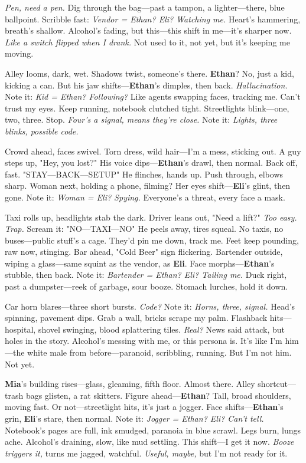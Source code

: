\documentclass{article}
\begin{document}
\textit{Pen, need a pen.} Dig through the bag—past a tampon, a lighter—there, blue ballpoint. Scribble fast: \textit{Vendor = Ethan? Eli? Watching me.} Heart’s hammering, breath’s shallow. Alcohol’s fading, but this—this shift in me—it’s sharper now. \textit{Like a switch flipped when I drank.} Not used to it, not yet, but it’s keeping me moving.

Alley looms, dark, wet. Shadows twist, someone’s there. \textbf{Ethan}? No, just a kid, kicking a can. But his jaw shifts—\textbf{Ethan}’s dimples, then back. \textit{Hallucination.} Note it: \textit{Kid = Ethan? Following?} Like agents swapping faces, tracking me. Can’t trust my eyes. Keep running, notebook clutched tight. Streetlights blink—one, two, three. Stop. \textit{Four’s a signal, means they’re close.} Note it: \textit{Lights, three blinks, possible code.}

Crowd ahead, faces swivel. Torn dress, wild hair—I’m a mess, sticking out. A guy steps up, "Hey, you lost?" His voice dips—\textbf{Ethan}’s drawl, then normal. Back off, fast. "STAY—BACK—SETUP" He flinches, hands up. Push through, elbows sharp. Woman next, holding a phone, filming? Her eyes shift—\textbf{Eli}’s glint, then gone. Note it: \textit{Woman = Eli? Spying.} Everyone’s a threat, every face a mask.

Taxi rolls up, headlights stab the dark. Driver leans out, "Need a lift?" \textit{Too easy. Trap.} Scream it: "NO—TAXI—NO" He peels away, tires squeal. No taxis, no buses—public stuff’s a cage. They’d pin me down, track me. Feet keep pounding, raw now, stinging. Bar ahead, "Cold Beer" sign flickering. Bartender outside, wiping a glass—same squint as the vendor, as \textbf{Eli}. Face morphs—\textbf{Ethan}’s stubble, then back. Note it: \textit{Bartender = Ethan? Eli? Tailing me.} Duck right, past a dumpster—reek of garbage, sour booze. Stomach lurches, hold it down.

Car horn blares—three short bursts. \textit{Code?} Note it: \textit{Horns, three, signal.} Head’s spinning, pavement dips. Grab a wall, bricks scrape my palm. Flashback hits—hospital, shovel swinging, blood splattering tiles. \textit{Real?} News said attack, but holes in the story. Alcohol’s messing with me, or this persona is. It’s like I’m him—the white male from before—paranoid, scribbling, running. But I’m not him. Not yet.

\textbf{Mia}’s building rises—glass, gleaming, fifth floor. Almost there. Alley shortcut—trash bags glisten, a rat skitters. Figure ahead—\textbf{Ethan}? Tall, broad shoulders, moving fast. Or not—streetlight hits, it’s just a jogger. Face shifts—\textbf{Ethan}’s grin, \textbf{Eli}’s stare, then normal. Note it: \textit{Jogger = Ethan? Eli? Can’t tell.} Notebook’s pages are full, ink smudged, paranoia in blue scrawl. Legs burn, lungs ache. Alcohol’s draining, slow, like mud settling. This shift—I get it now. \textit{Booze triggers it,} turns me jagged, watchful. \textit{Useful, maybe,} but I’m not ready for it.
\end{document}
